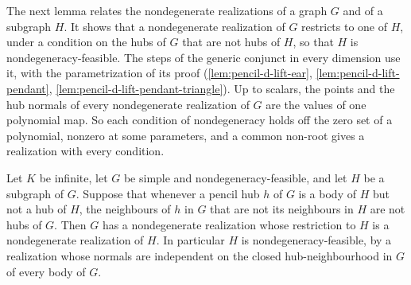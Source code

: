 The next lemma relates the nondegenerate realizations of a graph $G$ and
of a subgraph $H$. It shows that a nondegenerate realization of $G$
restricts to one of $H$, under a condition on the hubs of $G$ that are not
hubs of $H$, so that $H$ is nondegeneracy-feasible. The steps of the
generic conjunct in every dimension use it, with the parametrization of
its proof (\cref{lem:pencil-d-lift-ear}, \cref{lem:pencil-d-lift-pendant},
\cref{lem:pencil-d-lift-pendant-triangle}). Up to scalars, the points and
the hub normals of every nondegenerate realization of $G$ are the values
of one polynomial map. So each condition of nondegeneracy holds off the
zero set of a polynomial, nonzero at some parameters, and a common
non-root gives a realization with every condition.

\begin{lemma}
  \label{lem:pencil-generic-steer}
  \leanok
  Let $K$ be infinite, let $G$ be simple and nondegeneracy-feasible, and
  let $H$ be a subgraph of $G$. Suppose that whenever a pencil hub $h$ of $G$ is a
  body of $H$ but not a hub of $H$, the neighbours of $h$ in $G$ that are
  not its neighbours in $H$ are not hubs of $G$. Then $G$ has a
  nondegenerate realization whose restriction to $H$ is a nondegenerate
  realization of $H$. In particular $H$ is nondegeneracy-feasible, by a
  realization whose normals are independent on the closed
  hub-neighbourhood in $G$ of every body of $G$.
\end{lemma}
